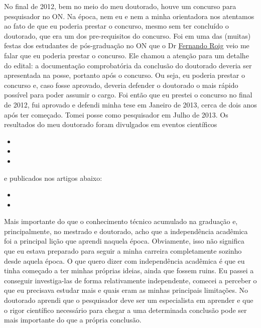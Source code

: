 No final de 2012, bem no meio do meu doutorado, houve um concurso para pesquisador no ON.
Na época, nem eu e nem a minha orientadora nos atentamos ao fato de que eu poderia 
prestar o concurso, mesmo sem ter concluído o doutorado, que era um dos pre-requisitos do
concurso. Foi em uma das (muitas) festas dos estudantes de pós-graduação no ON que
o Dr \href{https://lattes.cnpq.br/5822763057370791}{Fernando Roig} veio me falar que eu poderia prestar o concurso.
Ele chamou a atenção para um detalhe do edital: a documentação comprobatória da conclusão 
do doutorado deveria ser apresentada na posse, portanto após o concurso. 
Ou seja, eu poderia prestar o concurso e, caso fosse aprovado, deveria defender o doutorado
o mais rápido possível para poder assumir o cargo.
Foi então que eu prestei o concurso no final de 2012, fui aprovado e defendi minha tese em
Janeiro de 2013, cerca de dois anos após ter começado. Tomei posse como pesquisador
em Julho de 2013. Os resultados do meu doutorado foram divulgados em eventos científicos
\begin{itemize}
	\item {}
	\item {}
	\item {}
\end{itemize}
\noindent e publicados nos artigos abaixo:
\begin{itemize}
	\item {}
	\item {}
\end{itemize}

Mais importante do que o conhecimento técnico acumulado na graduação e, 
principalmente, no mestrado e doutorado, acho que a independência acadêmica 
foi a principal lição que aprendi naquela época.
Obviamente, isso não significa que eu estava preparado para seguir a minha 
carreira completamente sozinho desde aquela época. O que quero dizer com 
independência acadêmica é que eu tinha começado a ter minhas próprias ideias,
ainda que fossem ruins. Eu passei a conseguir investiga-las de forma 
relativamente independente, comecei a perceber o que eu precisava estudar 
mais e quais eram as minhas principais limitações.
No doutorado aprendi que o pesquisador deve ser um especialista em aprender
e que o rigor científico necessário para chegar a uma determinada conclusão pode ser
mais importante do que a própria conclusão.

